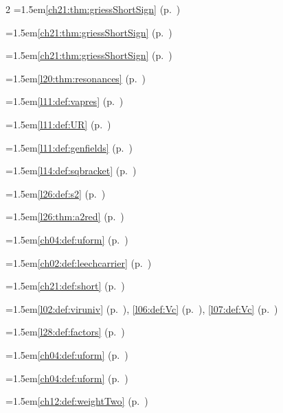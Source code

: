 \begin{multicols}{2}
\hangindent=1.5em\quad \ref{ch21:thm:griessShortSign} (p.~\pageref{ch21:thm:griessShortSign})\par
\hangindent=1.5em\quad \ref{ch21:thm:griessShortSign} (p.~\pageref{ch21:thm:griessShortSign})\par
\hangindent=1.5em\quad \ref{ch21:thm:griessShortSign} (p.~\pageref{ch21:thm:griessShortSign})\par
\hangindent=1.5em\quad \ref{l20:thm:resonances} (p.~\pageref{l20:thm:resonances})\par
\hangindent=1.5em\quad \ref{l11:def:vapres} (p.~\pageref{l11:def:vapres})\par
\hangindent=1.5em\quad \ref{l11:def:UR} (p.~\pageref{l11:def:UR})\par
\hangindent=1.5em\quad \ref{l11:def:genfields} (p.~\pageref{l11:def:genfields})\par
\hangindent=1.5em\quad \ref{l14:def:sqbracket} (p.~\pageref{l14:def:sqbracket})\par
\hangindent=1.5em\quad \ref{l26:def:s2} (p.~\pageref{l26:def:s2})\par
\hangindent=1.5em\quad \ref{l26:thm:a2red} (p.~\pageref{l26:thm:a2red})\par
\hangindent=1.5em\quad \ref{ch04:def:uform} (p.~\pageref{ch04:def:uform})\par
\hangindent=1.5em\quad \ref{ch02:def:leechcarrier} (p.~\pageref{ch02:def:leechcarrier})\par
\hangindent=1.5em\quad \ref{ch21:def:short} (p.~\pageref{ch21:def:short})\par
\hangindent=1.5em\quad \ref{l02:def:viruniv} (p.~\pageref{l02:def:viruniv}), \ref{l06:def:Vc} (p.~\pageref{l06:def:Vc}), \ref{l07:def:Vc} (p.~\pageref{l07:def:Vc})\par
\hangindent=1.5em\quad \ref{l28:def:factors} (p.~\pageref{l28:def:factors})\par
\hangindent=1.5em\quad \ref{ch04:def:uform} (p.~\pageref{ch04:def:uform})\par
\hangindent=1.5em\quad \ref{ch04:def:uform} (p.~\pageref{ch04:def:uform})\par
\par{}\par\nopagebreak\smallskip
\hangindent=1.5em\quad \ref{ch12:def:weightTwo} (p.~\pageref{ch12:def:weightTwo})\par

\end{multicols}
